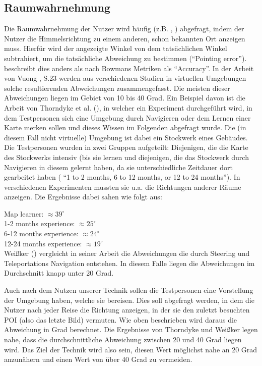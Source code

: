 \subsection{Raumwahrnehmung}
Die Raumwahrnehmung der Nutzer wird häufig (z.B. \cite{Kopper2006DesignEnvironments}, \cite{Richardson1999SpatialEnvironments}) abgefragt, indem der Nutzer die Himmelsrichtung zu einem anderen, schon bekannten Ort anzeigen muss. Hierfür wird der angezeigte Winkel von dem tatsächlichen Winkel subtrahiert, um die tatsächliche Abweichung zu bestimmen (“Pointing error”). \cite{Kopper2006DesignEnvironments} beschreibt dies anders als nach Bowmans Metriken als “Accuracy”.
In der Arbeit von Vuong \cite{29_POINTING_ERROR_jennyVuong_small}, S.23 werden aus verschiedenen Studien in virtuellen Umgebungen solche resultierenden Abweichungen zusammengefasst. Die meisten dieser Abweichungen liegen im Gebiet von 10 bis 40 Grad.
Ein Beispiel davon ist die Arbeit von Thorndyke et al. (\cite{Thorndyke1980LNAVIGATION}), in welcher ein Experiment durchgeführt wird, in dem Testpersonen sich eine Umgebung durch Navigieren oder dem Lernen einer Karte merken sollen und dieses Wissen im Folgenden abgefragt wurde.
Die (in diesem Fall nicht virtuelle) Umgebung ist dabei ein Stockwerk eines Gebäudes. Die Testpersonen wurden in zwei Gruppen aufgeteilt: Diejenigen, die die Karte des Stockwerks intensiv (bis sie  lernen und diejenigen, die das Stockwerk durch Navigieren in diesem gelernt haben, da sie unterschiedliche Zeitdauer dort gearbeitet haben ( “1 to 2 months, 6 to 12 months, or 12 to 24 months”).
In verschiedenen Experimenten mussten sie u.a. die Richtungen anderer Räume anzeigen.
Die Ergebnisse dabei sahen wie folgt aus: 

Map learner: $\approx 39 ^\circ$ \\
1-2 months experience: $\approx  25 ^\circ$ \\
6-12 months experience: $\approx  24 ^\circ$ \\
12-24 months experience: $\approx  19 ^\circ$ \\

Weißker (\cite{Weibker2018SpatialEnvironments}) vergleicht in seiner Arbeit die Abweichungen die durch Steering und Teleportations Navigation entstehen. In diesem Falle liegen die Abweichungen im Durchschnitt knapp unter 20 Grad.

Auch nach dem Nutzen unserer Technik sollen die Testpersonen eine Vorstellung der Umgebung haben, welche sie bereisen. Dies soll abgefragt werden, in dem die Nutzer nach jeder Reise die Richtung anzeigen, in der sie den zuletzt besuchten POI (also das letzte Bild) vermuten. Wie oben beschrieben wird daraus die Abweichung in Grad berechnet. 
Die Ergebnisse von Thorndyke und Weißker legen nahe, dass die durchschnittliche Abweichung zwischen 20 und 40 Grad liegen wird. Das Ziel der Technik wird also sein, diesen Wert möglichst nahe an 20 Grad anzunähern und einen Wert von über 40 Grad zu vermeiden.

